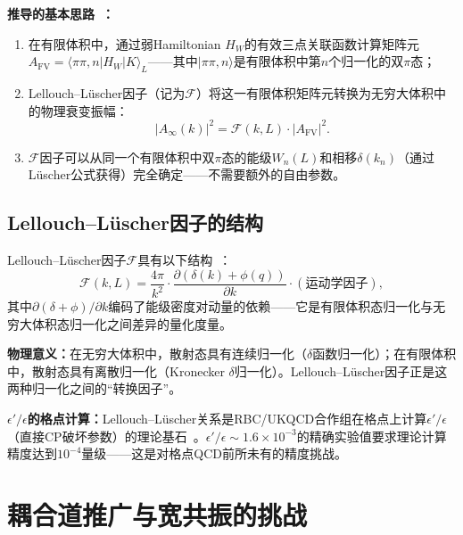 \documentclass[12pt,a4paper]{ctexart}
\theoremstyle{definition}
\begin{document}
\textbf{推导的基本思路~\cite{decayChannels2026}：}
\begin{enumerate}[leftmargin=*]
    \item 在有限体积中，通过弱Hamiltonian $H_W$的有效三点关联函数计算矩阵元$A_{\text{FV}} = \langle \pi\pi, n | H_W | K \rangle_{L}$——其中$|\pi\pi, n\rangle$是有限体积中第$n$个归一化的双$\pi$态；
    \item Lellouch--L\"uscher因子（记为$\mathcal{F}$）将这一有限体积矩阵元转换为无穷大体积中的物理衰变振幅：
    \begin{equation}\label{eq:LL_factor}
        |A_{\infty}(k)|^2 = \mathcal{F}(k, L) \cdot |A_{\text{FV}}|^2.
    \end{equation}
    \item $\mathcal{F}$因子可以从同一个有限体积中双$\pi$态的能级$W_n(L)$和相移$\delta(k_n)$（通过L\"uscher公式获得）完全确定——不需要额外的自由参数。
\end{enumerate}

\subsection{Lellouch--L\"uscher因子的结构}

Lellouch--L\"uscher因子$\mathcal{F}$具有以下结构~\cite{decayChannels2026}：
\begin{equation}\label{eq:LL_structure}
    \mathcal{F}(k, L) = \frac{4\pi}{k^2} \cdot \frac{\partial(\delta(k) + \phi(q))}{\partial k} \cdot (\text{运动学因子}),
\end{equation}
其中$\partial(\delta+\phi)/\partial k$编码了能级密度对动量的依赖——它是有限体积态归一化与无穷大体积态归一化之间差异的量化度量。

\textbf{物理意义：}在无穷大体积中，散射态具有连续归一化（$\delta$函数归一化）；在有限体积中，散射态具有离散归一化（Kronecker $\delta$归一化）。Lellouch--L\"uscher因子正是这两种归一化之间的``转换因子''。

\textbf{$\epsilon'/\epsilon$的格点计算：}Lellouch--L\"uscher关系是RBC/UKQCD合作组在格点上计算$\epsilon'/\epsilon$（直接CP破坏参数）的理论基石~\cite{decayChannels2026}。$\epsilon'/\epsilon \sim 1.6 \times 10^{-3}$的精确实验值要求理论计算精度达到$10^{-4}$量级——这是对格点QCD前所未有的精度挑战。

\section{耦合道推广与宽共振的挑战}
\end{document}
